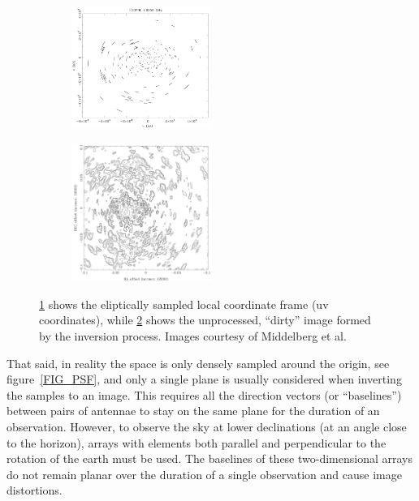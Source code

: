 \documentclass[a4paper, two column]{article}
\begin{document}
\begin{figure}[h]
 \begin{mdframed}
  \begin{subfigure}[b]{\textwidth}
   \centering
   \includegraphics[width=0.5\textwidth]{uv_space.png}
   \caption{}
   \label{FIG_IMAGE_FORMATION_A}
  \end{subfigure}
  \begin{subfigure}[b]{\textwidth}
   \centering
   \includegraphics[width=0.5\textwidth]{lm_space.png}
   \caption{}
   \label{FIG_IMAGE_FORMATION_B}
  \end{subfigure}
  \caption[Sampled uv space and its image]{\ref{FIG_IMAGE_FORMATION_A} shows the eliptically sampled local coordinate frame (uv coordinates), while \ref{FIG_IMAGE_FORMATION_B} shows the 
					   unprocessed, ``dirty'' image formed by the inversion process. Images courtesy of Middelberg et al. \cite{middelberg2008high}}
  \label{FIG_IMAGE_FORMATION}
 \end{mdframed}
\end{figure}

That said, in reality the space is only densely sampled around the origin, see figure~\ref{FIG_PSF}, and only a single plane is usually considered when inverting the samples to an image. This 
requires all the direction vectors (or ``baselines'') between pairs of antennae to stay on the same plane for the duration of an observation. However, to observe the sky at lower declinations 
(at an angle close to the horizon), arrays with elements both parallel and perpendicular to the rotation of the earth must be used. The baselines of these two-dimensional arrays do not remain 
planar over the duration of a single observation and cause image distortions. 
\end{document}
